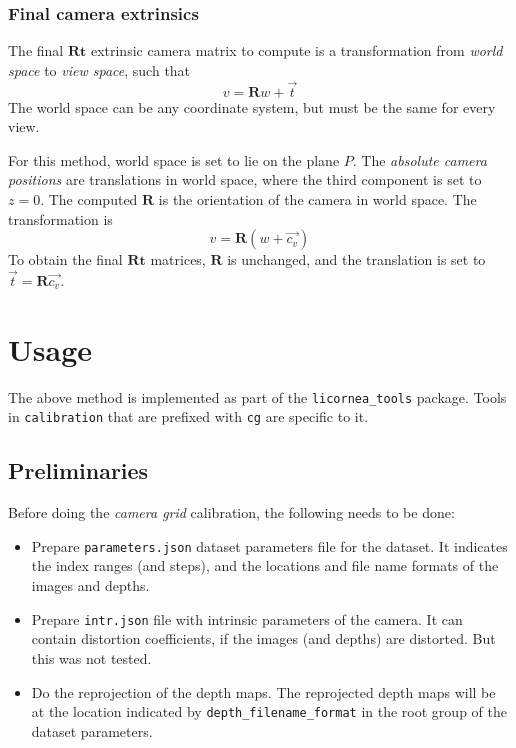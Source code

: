\documentclass{scrreprt}
\newcommand{\matr}[1]{\mathbf{#1}}
\begin{document}
\subsection{Final camera extrinsics}
The final $\matr{Rt}$ extrinsic camera matrix to compute is a transformation from \emph{world space} to \emph{view space}, such that
\begin{equation*}
v = \matr{R} w + \vec{t}
\end{equation*}
The world space can be any coordinate system, but must be the same for every view.

For this method, world space is set to lie on the plane $P$. The \emph{absolute camera positions} are translations in world space, where the third component is set to $z = 0$. The computed $\matr{R}$ is the orientation of the camera in world space. The transformation is
\begin{equation*}
v = \matr{R} (w + \vec{c_v})
\end{equation*}
To obtain the final $\matr{Rt}$ matrices, $\matr{R}$ is unchanged, and the translation is set to $\vec{t} = \matr{R} \vec{c_v}$.


\chapter{Usage}
The above method is implemented as part of the \texttt{licornea\_tools} package. Tools in \texttt{calibration} that are prefixed with \texttt{cg} are specific to it.

\section{Preliminaries}
Before doing the \emph{camera grid} calibration, the following needs to be done:
\begin{itemize}
\item Prepare \texttt{parameters.json} dataset parameters file for the dataset. It indicates the index ranges (and steps), and the locations and file name formats of the images and depths.
\item Prepare \texttt{intr.json} file with intrinsic parameters of the camera. It can contain distortion coefficients, if the images (and depths) are distorted. But this was not tested.
\item Do the reprojection of the depth maps. The reprojected depth maps will be at the location indicated by \texttt{depth\_filename\_format} in the root group of the dataset parameters.
\end{itemize}
\end{document}
